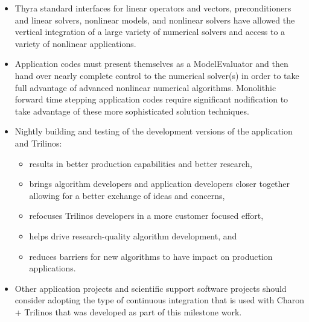\documentclass[pdf,ps2pdf,11pt]{SANDreport}
\begin{document}
{\begin{itemize}
{}\item Thyra standard interfaces for linear operators and vectors,
preconditioners and linear solvers, nonlinear models, and nonlinear solvers
have allowed the vertical integration of a large variety of numerical solvers
and access to a variety of nonlinear applications.

{}\item Application codes must present themselves as a ModelEvaluator and then
hand over nearly complete control to the numerical solver(s) in order to take
full advantage of advanced nonlinear numerical algorithms.  Monolithic forward
time stepping application codes require significant nodification to take advantage of these more
sophisticated solution techniques.

{}\item Nightly building and testing of the development versions of the
application and Trilinos:

  \begin{itemize}

  {}\item results in better production capabilities and better research,

  {}\item brings algorithm developers and application developers closer
  together allowing for a better exchange of ideas and concerns,

  {}\item refocuses Trilinos developers in a more customer focused effort,

  {}\item helps drive research-quality algorithm development, and
        
  {}\item reduces barriers for new algorithms to have impact on production
  applications.

  \end{itemize}

{}\item Other application projects and scientific support software projects
should consider adopting the type of continuous integration that is used with
Charon + Trilinos that was developed as part of this milestone work.

\end{itemize}

%
%
%
%
%
%
%


}
\end{document}
